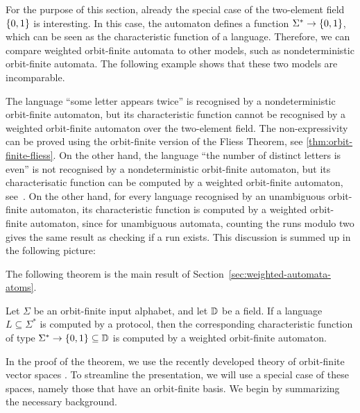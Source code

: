 For the purpose of this section, already the special case of the two-element field $\{0,1\}$ is interesting. In this case, the automaton defines a function $\Sigma^* \to \{0,1\}$, which can be seen as the characteristic function of a language. Therefore, we can compare weighted orbit-finite automata to other models, such as nondeterministic orbit-finite automata. The following example shows that these two  models are incomparable. 

\begin{myexample}
    The language ``some letter appears twice'' is recognised by a nondeterministic orbit-finite automaton, but its characteristic function cannot be  recognised by a weighted orbit-finite automaton over the two-element field. The non-expressivity can be proved using the orbit-finite version of the Fliess Theorem, see \cref{thm:orbit-finite-fliess}. On the other hand, the  language ``the number of distinct letters is even'' is not recognised by a nondeterministic orbit-finite automaton, but its characterisatic function can  be computed by a weighted orbit-finite automaton, see~\cite[Example 3.2]{orbitFiniteVectorTheoretics}. On the other hand, for every language recognised by an unambiguous orbit-finite automaton, its characteristic function is computed by a weighted orbit-finite automaton, since for unambiguous automata, counting the runs modulo two gives the same result as checking if a run exists. This discussion is summed up in the following picture:
\end{myexample}

The following theorem is the main result of Section~\ref{sec:weighted-automata-atoms}.
\begin{theorem}\label{thm:orbit-finite-protocol-to-weighted}
    Let $\Sigma$ be an orbit-finite input alphabet, and let $\mathbb D$ be a field.
    If a language $L \subseteq \Sigma^*$ is computed by a protocol, then the corresponding characteristic function of type $\Sigma^* \to \{0,1\} \subseteq \mathbb D$  is computed by a weighted orbit-finite automaton.
\end{theorem}

In the proof of the theorem, we use the recently developed theory of orbit-finite vector spaces \cite{orbitFiniteVectorTheoretics}.
To streamline the presentation, we will use a special case of these spaces, namely those that have an orbit-finite basis.
We begin by summarizing the necessary background.

